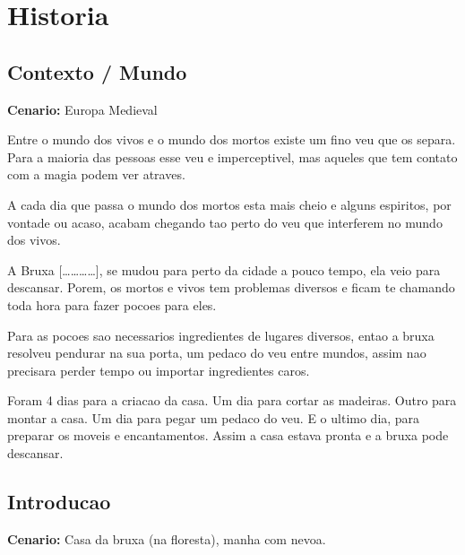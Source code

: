 \documentclass[12pt]{article}
\begin{document}
\newpage

\section{Historia}

\subsection{Contexto / Mundo}

\textbf{Cenario:} Europa Medieval

\vspace{0.3cm}

\noindent Entre o mundo dos vivos e o mundo dos mortos existe um fino veu que os separa. Para a maioria das pessoas esse veu e imperceptivel, mas aqueles que tem contato com a magia podem ver atraves.

\vspace{0.2cm}

\noindent A cada dia que passa o mundo dos mortos esta mais cheio e alguns espiritos, por vontade ou acaso, acabam chegando tao perto do veu que interferem no mundo dos vivos.

\vspace{0.2cm}

\noindent A Bruxa [\ldots\ldots\ldots\ldots], se mudou para perto da cidade a pouco tempo, ela veio para descansar. Porem, os mortos e vivos tem problemas diversos e ficam te chamando toda hora para fazer pocoes para eles.

\vspace{0.2cm}

\noindent Para as pocoes sao necessarios ingredientes de lugares diversos, entao a bruxa resolveu pendurar na sua porta, um pedaco do veu entre mundos, assim nao precisara perder tempo ou importar ingredientes caros.

\vspace{0.2cm}

\noindent Foram 4 dias para a criacao da casa. Um dia para cortar as madeiras. Outro para montar a casa. Um dia para pegar um pedaco do veu. E o ultimo dia, para preparar os moveis e encantamentos. Assim a casa estava pronta e a bruxa pode descansar.

\subsection{Introducao}

\textbf{Cenario:} Casa da bruxa (na floresta), manha com nevoa.
\end{document}
